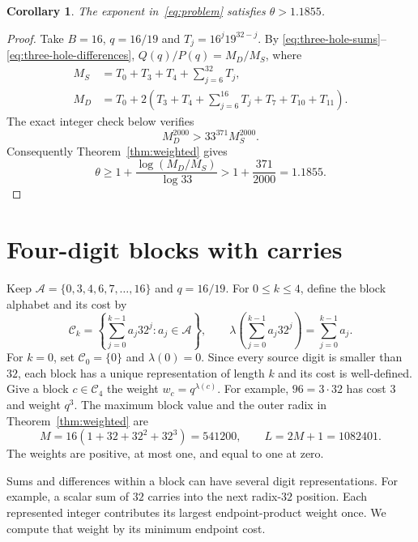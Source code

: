 \documentclass[11pt,a4paper]{article}
\newtheorem{corollary}[theorem]{Corollary}
\newcommand{\A}{\mathcal A}
\begin{document}
\begin{corollary}\label{cor:sparse}
The exponent in~\eqref{eq:problem} satisfies $\theta>1.1855$.
\end{corollary}
\begin{proof}
Take $B=16$, $q=16/19$ and $T_j=16^j19^{32-j}$. By
\eqref{eq:three-hole-sums}--\eqref{eq:three-hole-differences},
$Q(q)/P(q)=M_D/M_S$, where
\begin{align}
 M_S&=T_0+T_3+T_4+\sum_{j=6}^{32}T_j,\label{eq:MS}\\
 M_D&=T_0+2\left(T_3+T_4+\sum_{j=6}^{16}T_j+T_7+T_{10}+T_{11}\right).
 \label{eq:MD}
\end{align}
The exact integer check below verifies
\begin{equation}\label{eq:main-certificate}
 M_D^{2000}>33^{371}M_S^{2000}.
\end{equation}
Consequently Theorem~\ref{thm:weighted} gives
\[
 \theta\ge1+\frac{\log(M_D/M_S)}{\log33}
 >1+\frac{371}{2000}=1.1855.
\]
\end{proof}

\section{Four-digit blocks with carries}
Keep $\A=\{0,3,4,6,7,\ldots,16\}$ and $q=16/19$. For $0\le k\le4$,
define the block alphabet and its cost by
\begin{equation}\label{eq:block-alphabet}
 \mathcal C_k=\left\{\sum_{j=0}^{k-1}a_j32^j:a_j\in\A\right\},
 \qquad
 \lambda\left(\sum_{j=0}^{k-1}a_j32^j\right)=\sum_{j=0}^{k-1}a_j.
\end{equation}
For $k=0$, set $\mathcal C_0=\{0\}$ and $\lambda(0)=0$.
Since every source digit is smaller than $32$, each block has a unique
representation of length $k$ and its cost is well-defined. Give a block
$c\in\mathcal C_4$ the weight $w_c=q^{\lambda(c)}$. For example,
$96=3\cdot32$ has cost $3$ and weight $q^3$.
The maximum block value and the outer radix in Theorem~\ref{thm:weighted}
are
\begin{equation}\label{eq:block-radius}
 M=16(1+32+32^2+32^3)=541200,
 \qquad L=2M+1=1082401.
\end{equation}
The weights are positive, at most one, and equal to one at zero.

Sums and differences within a block can have several digit representations.
For example, a scalar sum of $32$ carries into the next radix-$32$ position.
Each represented integer contributes its largest endpoint-product weight
once. We compute that weight by its minimum endpoint cost.
\end{document}
